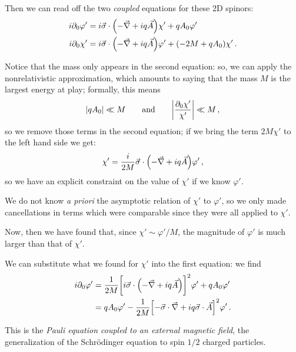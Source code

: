 \documentclass[main.tex]{subfiles}
\begin{document}
Then we can read off the two \emph{coupled} equations for these 2D spinors: 
%
\begin{subequations}
\begin{align}
i \partial_0 \varphi ' &= i \vec{\sigma} \cdot \qty(- \vec{\nabla} + i q \vec{A}) \chi '
+ q A_0 \varphi '  \\
i \partial_0 \chi ' &= i \vec{\sigma} \cdot \qty(- \vec{\nabla} + i q \vec{A}) \varphi ' +
(- 2 M + q A_0 ) \chi '
\,.
\end{align}
\end{subequations}

Notice that the mass only appears in the second equation: so, we can apply the nonrelativistic approximation, which amounts to saying that the mass \(M\) is the largest energy at play; formally, this means 
%
\begin{align}
\abs{q A_0} \ll M 
\qquad \text{and} \qquad
\abs{\frac{\partial_0 \chi '}{\chi '}} \ll M
\,,
\end{align}
%
so we remove those terms in the second equation; if we bring the term \(2 M \chi '\) to the left hand side we get: 
%
\begin{align}
\chi ' =  \frac{i}{2M} \vec{\sigma} \cdot \qty(- \vec{\nabla} + i q \vec{A}) \varphi '
\,,
\end{align}
%
so we have an explicit constraint on the value of \(\chi '\) if we know \(\varphi '\).

We do not know \emph{a priori} the asymptotic relation of \(\chi '\) to \(\varphi '\), so we only made cancellations in terms which were comparable since they were all applied to \(\chi '\).

Now, then we have found that, since \(\chi ' \sim \varphi ' / M\), the magnitude of \(\varphi '\) is much larger than that of \(\chi '\). 

We can substitute what we found for \(\chi '\) into the first equation: we find 
%
\begin{subequations}
\begin{align}
i \partial_0 \varphi ' &= \frac{1}{2M} \qty[i \vec{\sigma} \cdot \qty(- \vec{\nabla} + iq \vec{A})]^2 \varphi ' + q A_0 \varphi '  \\
&= q A_0 \varphi ' - \frac{1}{2M} \qty[- \vec{\sigma} \cdot \vec{\nabla} + iq \vec{\sigma} \cdot \vec{A}]^2 \varphi '
\,.
\end{align}
\end{subequations}

This is the \emph{Pauli equation coupled to an external magnetic field}, the generalization of the Schrödinger equation to spin \(1/2\) charged particles.
\end{document}
